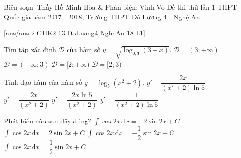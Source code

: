 \begin{name}
{Biên soạn: Thầy Hồ Minh Hòa \& Phản biện: %
Vinh Vo}
{Đề thi thử lần 1 THPT Quốc gia năm  2017 - 2018, Trường THPT Đô Lương 4 - Nghệ An}
\end{name}
\setcounter{ex}{0}\setcounter{bt}{0}
[ans/ans-2-GHK2-13-DoLuong4-NgheAn-18-L1]
\begin{ex}%
Tìm tập xác định $ \mathscr{D} $ của hàm số $ y=\sqrt{\log_{0{,}3}(3-x)} $.
\choice
{$\mathscr{D}=(3;+\infty)$}
{$\mathscr{D}=(-\infty;3)$}
{$\mathscr{D}=[2;+\infty)$}
{\True $\mathscr{D}=[2;3)$}
\loigiai{ Điều kiện xác định $$ \log_{0{,}3}{(3-x)} \ge 0 \Leftrightarrow \begin{cases}
	3-x >0 \\ 3-x \le 1
	\end{cases} 
	\Leftrightarrow 
	\begin{cases}
	x<3 \\ x \ge 2
	\end{cases}
	\Leftrightarrow 2 \le x <3.$$
Tập xác định là $\mathscr{D}=[2;3)$.
}
\end{ex}
\begin{ex}%
Tính đạo hàm của hàm số $ y=\log_5 (x^2+2) $.	
\choice
{\True $ y'=\dfrac{2x}{(x^2+2)\ln 5} $}
{$ y'=\dfrac{2x}{(x^2+2)} $}
{$ y'=\dfrac{2x\ln 5}{(x^2+2)} $}
{$ y'=\dfrac{1}{(x^2+2)\ln 5} $}
\end{ex}
\begin{ex}%
	Phát biểu nào sau đây đúng?	
	\choice
	{$ \displaystyle\int\limits \cos 2x\mathrm{\,d}x=-2\sin 2x+C$}
	{$ \displaystyle\int\limits \cos 2x\mathrm{\,d}x=2\sin 2x+C$}
	{$ \displaystyle\int\limits \cos 2x\mathrm{\,d}x=-\dfrac{1}{2}\sin 2x+C$}
	{\True $ \displaystyle\int\limits \cos 2x\mathrm{\,d}x=\dfrac{1}{2}\sin 2x+C$}
\end{ex}
